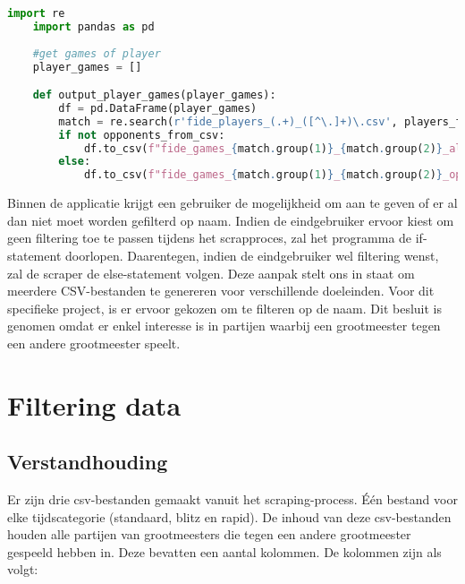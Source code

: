 \begin{lstlisting}[language=Python]
    import re
    import pandas as pd
    
    #get games of player
    player_games = []

    def output_player_games(player_games):
        df = pd.DataFrame(player_games)
        match = re.search(r'fide_players_(.+)_([^\.]+)\.csv', players_file_name)
        if not opponents_from_csv:
            df.to_csv(f"fide_games_{match.group(1)}_{match.group(2)}_all.csv", index=False)
        else:
            df.to_csv(f"fide_games_{match.group(1)}_{match.group(2)}_oppfromcsv.csv", index=False)
\end{lstlisting}

Binnen de applicatie krijgt een gebruiker de mogelijkheid om aan te geven of er al dan niet moet worden gefilterd op naam. Indien de eindgebruiker ervoor kiest om geen filtering toe te passen tijdens het scrapproces, zal het programma de if-statement doorlopen. Daarentegen, indien de eindgebruiker wel filtering wenst, zal de scraper de else-statement volgen. Deze aanpak stelt ons in staat om meerdere CSV-bestanden te genereren voor verschillende doeleinden. Voor dit specifieke project, is er ervoor gekozen om te filteren op de naam. Dit besluit is genomen omdat er enkel interesse is in partijen waarbij een grootmeester tegen een andere grootmeester speelt.

\section{Filtering data}

\subsection{Verstandhouding}

Er zijn drie csv-bestanden gemaakt vanuit het scraping-process. Één bestand voor elke tijdscategorie (standaard, blitz en rapid). De inhoud van deze csv-bestanden houden alle partijen van grootmeesters die tegen een andere grootmeester gespeeld hebben in. Deze bevatten een aantal kolommen. De kolommen zijn als volgt:

